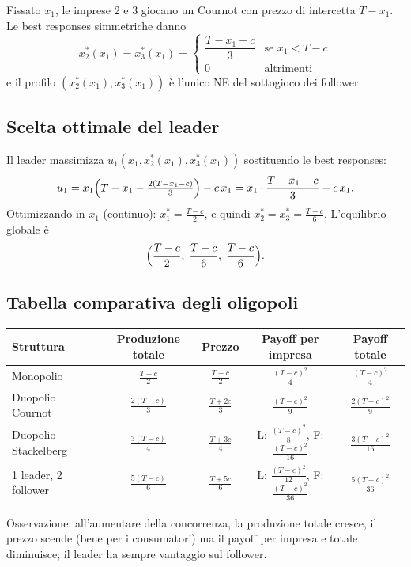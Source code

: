 \documentclass[12pt,a4paper,twoside]{book}
\theoremstyle{plain}
\theoremstyle{definition}
\begin{document}
Fissato $x_1$, le imprese 2 e 3 giocano un Cournot con prezzo di intercetta $T-x_1$. Le best responses simmetriche danno
\[
  x_2^*(x_1) = x_3^*(x_1) = \begin{cases}
    \dfrac{T-x_1-c}{3} & \text{se }x_1 < T-c\\
    0 & \text{altrimenti}
  \end{cases}
\]
e il profilo $(x_2^*(x_1), x_3^*(x_1))$ è l'unico NE del sottogioco dei follower.

\subsection{Scelta ottimale del leader}

Il leader massimizza $u_1(x_1, x_2^*(x_1), x_3^*(x_1))$ sostituendo le best responses:
\[
  u_1 = x_1\Bigl(T - x_1 - \tfrac{2(T-x_1-c)}{3}\Bigr) - c\,x_1
       = x_1\cdot\frac{T-x_1-c}{3} - c\,x_1.
\]
Ottimizzando in $x_1$ (continuo): $x_1^* = \frac{T-c}{2}$, e quindi $x_2^*=x_3^*=\frac{T-c}{6}$. L'equilibrio globale è
\[
  \Bigl(\frac{T-c}{2},\;\frac{T-c}{6},\;\frac{T-c}{6}\Bigr).
\]

\subsection{Tabella comparativa degli oligopoli}

\begin{center}
\begin{tabular}{lcccc}
\toprule
Struttura & Produzione totale & Prezzo & Payoff per impresa & Payoff totale \\
\midrule
Monopolio & $\tfrac{T-c}{2}$ & $\tfrac{T+c}{2}$ & $\tfrac{(T-c)^2}{4}$ & $\tfrac{(T-c)^2}{4}$ \\
Duopolio Cournot & $\tfrac{2(T-c)}{3}$ & $\tfrac{T+2c}{3}$ & $\tfrac{(T-c)^2}{9}$ & $\tfrac{2(T-c)^2}{9}$ \\
Duopolio Stackelberg & $\tfrac{3(T-c)}{4}$ & $\tfrac{T+3c}{4}$ & L: $\tfrac{(T-c)^2}{8}$, F: $\tfrac{(T-c)^2}{16}$ & $\tfrac{3(T-c)^2}{16}$ \\
1 leader, 2 follower & $\tfrac{5(T-c)}{6}$ & $\tfrac{T+5c}{6}$ & L: $\tfrac{(T-c)^2}{12}$, F: $\tfrac{(T-c)^2}{36}$ & $\tfrac{5(T-c)^2}{36}$ \\
\bottomrule
\end{tabular}
\end{center}

Osservazione: all'aumentare della concorrenza, la produzione totale cresce, il prezzo scende (bene per i consumatori) ma il payoff per impresa e totale diminuisce; il leader ha sempre vantaggio sul follower.
\end{document}
